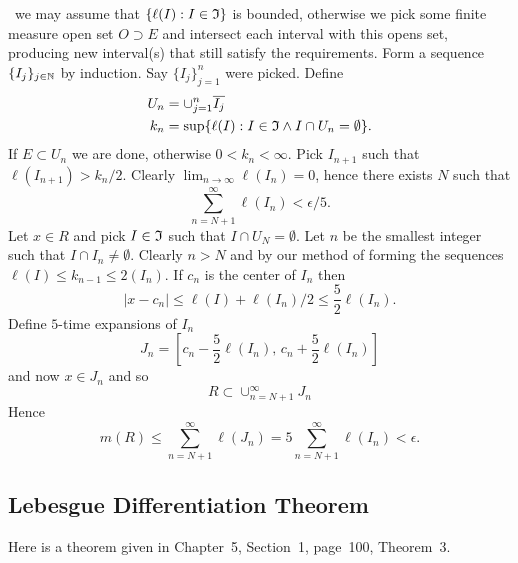 \begin{thmproof}
\Wlogy\ we may assume that \(\{\ell(I): I\in\mathfrak{I}\}\) is bounded,
otherwise we pick some finite measure open set \(O\supset E\) 
and intersect each interval with this opens set, producing new interval(s)
that still satisfy the requirements.
Form a sequence \(\{I_j\}_{j\in\mathbb{N}}\) by induction. Say 
\(\{I_j\}_{j=1}^n\) were picked. Define
\begin{align*}
U_n &= \cup_{j=1}^n \overline{I_j} \\
k_n &= \sup \{\ell(I): I\in\mathfrak{I} \wedge I \cap U_n = \emptyset\}.
\end{align*}
If \(E\subset U_n\) we are done, otherwise \(0< k_n < \infty\).
Pick \(I_{n+1}\) such that \(\ell(I_{n+1}) > k_n/2\).
Clearly \(\lim_{n\to\infty} \ell(I_n) = 0\), hence there exists $N$
such that
\begin{equation*}
\sum_{n=N+1}^\infty \ell(I_n) < \epsilon/5.
\end{equation*}
Let \(x\in R\) and pick \(I\in\mathfrak{I}\) such that \(I\cap U_N=\emptyset\).
Let $n$ be the smallest integer such that \(I\cap I_n \neq \emptyset\).
Clearly \(n>N\) 
and by our method of forming the sequences 
\(\ell(I) \leq k_{n-1} \leq 2(I_n)\). If \(c_n\) is the center of \(I_n\) then
\begin{equation*}
|x-c_n| \leq \ell(I) + \ell(I_n)/2 \leq \frac{5}{2} \ell(I_n).
\end{equation*}
Define  $5$-time expansions of \(I_n\)
\begin{equation*}
J_n = \left[c_n - \frac{5}{2} \ell(I_n),\, c_n + \frac{5}{2} \ell(I_n)\right]
\end{equation*}
and now  \(x\in J_n\) and so
\begin{equation*}
R \subset \cup_{n=N+1}^\infty J_n
\end{equation*}
Hence
\begin{equation*}
m(R) 
\leq \sum_{n=N+1}^\infty \ell(J_n)
= 5\sum_{n=N+1}^\infty \ell(I_n)
< \epsilon.
\end{equation*}
\end{thmproof}


\subsection{Lebesgue Differentiation Theorem}

Here is a theorem given in \cite{Royden} Chapter~5, Section~1, page~100,
Theorem~3.


